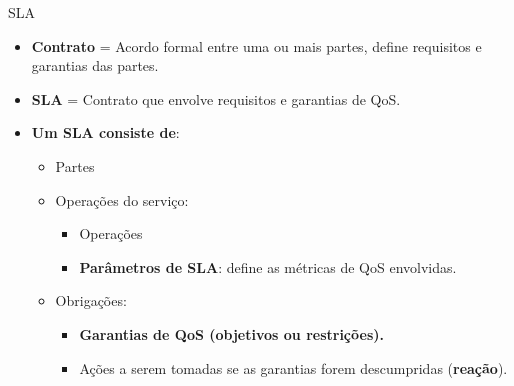 \documentclass[xcolor=svgnames]{beamer}
\begin{document}
    \begin{frame}{SLA }
        \begin{itemize}
          \item <1-> \textbf{Contrato} = Acordo formal entre uma ou mais partes, define requisitos e garantias das partes.
          \item <2-> \textbf{SLA} = Contrato que envolve requisitos e garantias de QoS.
          \item <3-> \textbf{Um SLA consiste de}:
            \begin{itemize}
              \item Partes
              \item Operações do serviço:
                    \begin{itemize}
                      \item <4-> Operações
                      \item <5-> \textbf{Parâmetros de SLA}: define as métricas de QoS envolvidas.
                    \end{itemize}
              \item Obrigações:
                      \begin{itemize}
                        \item <6-> \textbf{Garantias de QoS (objetivos ou restrições).}
                        \item <7-> Ações a serem tomadas se as garantias forem descumpridas (\textbf{reação}).
                      \end{itemize}
            \end{itemize}
        \end{itemize}
    \end{frame}
\end{document}
